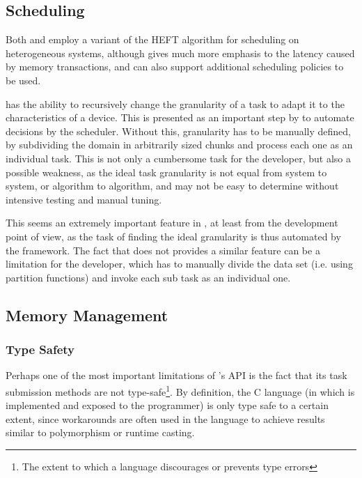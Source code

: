 \documentclass[main.tex]{subfiles}
\begin{document}
\subsection{Scheduling}

Both \starpu and \gama employ a variant of the \acs{HEFT} algorithm for scheduling on heterogeneous systems, although \starpu gives much more emphasis to the latency caused by memory transactions, and can also support additional scheduling policies to be used.

\gama has the ability to recursively change the granularity of a task to adapt it to the characteristics of a device. This is presented as an important step by \gama to automate decisions by the scheduler. Without this, granularity has to be manually defined, by subdividing the domain in arbitrarily sized chunks and process each one as an individual task. This is not only a cumbersome task for the developer, but also a possible weakness, as the ideal task granularity is not equal from system to system, or algorithm to algorithm, and may not be easy to determine without intensive testing and manual tuning.

This seems an extremely important feature in \gama, at least from the development point of view, as the task of finding the ideal granularity is thus automated by the framework. The fact that \starpu does not provides a similar feature can be a limitation for the developer, which has to manually divide the data set (i.e. using partition functions) and invoke each sub task as an individual one.

\subsection{Memory Management}

\subsubsection{Type Safety} \label{sec:comparison:type_safety}

Perhaps one of the most important limitations of \starpu's API is the fact that its task submission methods are not type-safe\footnote{The extent to which a language discourages or prevents type errors}. By definition, the C language (in which \starpu is implemented and exposed to the programmer) is only type safe to a certain extent, since workarounds are often used in the language to achieve results similar to polymorphism or runtime casting.
\end{document}
